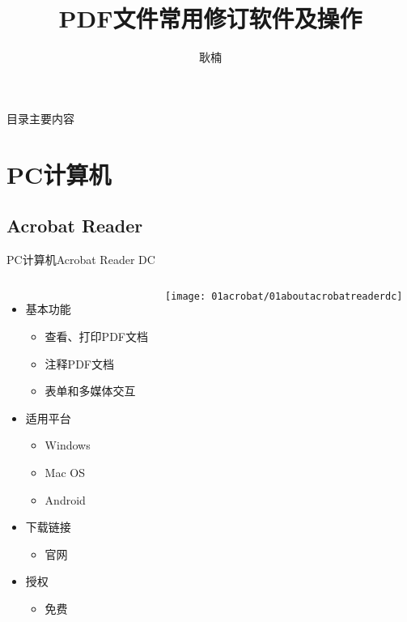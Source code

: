 \documentclass[fontset = none, t, aspectratio=169]{ctexbeamer}
\title[pdfReview]{\Large PDF文件常用修订软件及操作}
\author[N. Geng]{耿楠}
\date{\tosemester} %
\institute[教发中心]{教学发展中心\\西北农林科技大学}
\begin{document}
\begin{frame}
  \maketitle
\end{frame}


\begin{frame}{目录}{主要内容}
  \begin{multicols}{2}
    \tableofcontents
  \end{multicols}  
\end{frame}

\section{PC计算机}
\subsection{Acrobat Reader}
\begin{frame}{PC计算机}{Acrobat Reader DC}
  \begin{columns}[c]
    \begin{itemize}
    \item 基本功能
      \begin{itemize}
      \item 查看、打印PDF文档
      \item \alert{注释}PDF文档
      \item 表单和多媒体交互
      \end{itemize}
    \item 适用平台
      \begin{itemize}
      \item Windows
      \item Mac OS
      \item Android
      \end{itemize}
    \item 下载链接
      \begin{itemize}
      \item 官网
      \end{itemize}
    \item 授权
      \begin{itemize}
      \item \alert{免费}
      \end{itemize}
    \end{itemize}
    \texttt{[image: 01acrobat/01aboutacrobatreaderdc]}
  \end{columns}
\end{frame}
\end{document}
